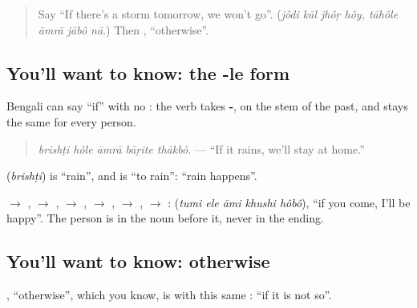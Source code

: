 \label{lesson:BN-C274-brishti-hole}



\begin{quote}
Say \textquotedblleft{}If there's a storm tomorrow, we won't go\textquotedblright{}. (\emph{jôdi kāl jhôṛ hôy, tāhôle āmrā jābô nā}.) Then \textbf{}, \textquotedblleft{}otherwise\textquotedblright{}.
\end{quote}

\subsection*{You'll want to know: the -le form}
Bengali can say \textquotedblleft{}if\textquotedblright{} with no \textbf{}: the verb takes \textbf{-}, on the stem of the past, and stays the same for every person.

\begin{quote}
\textbf{    }
\end{quote}

\begin{quote}
\emph{brishṭi hôle āmrā bāṛite thākbô.} — \textquotedblleft{}If it rains, we'll stay at home.\textquotedblright{}
\end{quote}

\textbf{} (\emph{brishṭi}) is \textquotedblleft{}rain\textquotedblright{}, and \textbf{ } is \textquotedblleft{}to rain\textquotedblright{}: \textquotedblleft{}rain happens\textquotedblright{}.

\textbf{} $\to$ \textbf{}, \textbf{} $\to$ \textbf{}, \textbf{} $\to$ \textbf{}, \textbf{} $\to$ \textbf{}, \textbf{} $\to$ \textbf{}, \textbf{} $\to$ \textbf{}: \textbf{    } (\emph{tumi ele āmi khushi hôbô}), \textquotedblleft{}if you come, I'll be happy\textquotedblright{}. The person is in the noun before it, never in the ending.

\subsection*{You'll want to know: otherwise}
\textbf{}, \textquotedblleft{}otherwise\textquotedblright{}, which you know, is \textbf{} with this same \textbf{}: \textquotedblleft{}if it is not so\textquotedblright{}.

